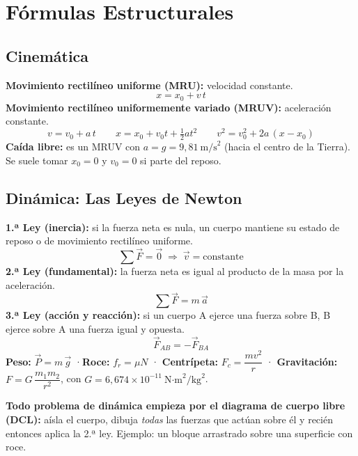 \documentclass[12pt, letterpaper]{article}
\begin{document}
\newpage

\section{Fórmulas Estructurales}

\subsection{Cinemática}

\begin{cuadroteoria}
  \textbf{Movimiento rectilíneo uniforme (MRU):} velocidad constante.
  \[
    x = x_0 + v\,t
  \]
  \textbf{Movimiento rectilíneo uniformemente variado (MRUV):} aceleración constante.
  \[
    v = v_0 + a\,t \qquad
    x = x_0 + v_0 t + \tfrac{1}{2} a t^2 \qquad
    v^2 = v_0^2 + 2a\,(x - x_0)
  \]
  \textbf{Caída libre:} es un MRUV con $a = g = 9{,}81\ \text{m/s}^2$ (hacia el centro de la Tierra). Se suele tomar $x_0 = 0$ y $v_0 = 0$ si parte del reposo.
\end{cuadroteoria}

\subsection{Dinámica: Las Leyes de Newton}

\begin{cuadroteoria}
  \textbf{1.ª Ley (inercia):} si la fuerza neta es nula, un cuerpo mantiene su estado de reposo o de movimiento rectilíneo uniforme.
  \[
    \sum \vec{F} = \vec{0} \;\Rightarrow\; \vec{v} = \text{constante}
  \]
  \textbf{2.ª Ley (fundamental):} la fuerza neta es igual al producto de la masa por la aceleración.
  \[
    \sum \vec{F} = m\,\vec{a}
  \]
  \textbf{3.ª Ley (acción y reacción):} si un cuerpo A ejerce una fuerza sobre B, B ejerce sobre A una fuerza igual y opuesta.
  \[
    \vec{F}_{AB} = -\vec{F}_{BA}
  \]
  \textbf{Peso:} $\vec{P} = m\,\vec{g}$ \quad·\quad \textbf{Roce:} $f_r = \mu N$ \quad·\quad
  \textbf{Centrípeta:} $F_c = \dfrac{m v^2}{r}$ \quad·\quad
  \textbf{Gravitación:} $F = G\,\dfrac{m_1 m_2}{r^2}$, con $G = 6{,}674 \times 10^{-11}\ \text{N·m}^2/\text{kg}^2$.
\end{cuadroteoria}

\noindent\textbf{Todo problema de dinámica empieza por el diagrama de cuerpo libre (DCL):} aísla el cuerpo, dibuja \emph{todas} las fuerzas que actúan sobre él y recién entonces aplica la 2.ª ley. Ejemplo: un bloque arrastrado sobre una superficie con roce.
\end{document}
